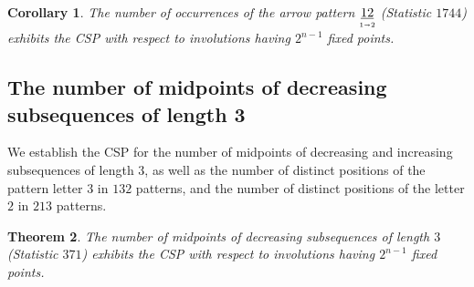 \documentclass{amsart}
\newtheorem{thm}{Theorem}[section]
\newtheorem{cor}[thm]{Corollary}
\theoremstyle{definition}
\newcommand{\arrowpattern}{\underset{\mathsmaller{1\shortrightarrow 2}}{\underline{12}}}
\newcommand{\cdes}{\textnormal{cdes}}
\begin{document}
\begin{cor}\label{cor:Corteel_arrow_CSP}
The number of occurrences of the arrow pattern $\arrowpattern$ (Statistic $1744$) exhibits the CSP with respect to involutions having $2^{n-1}$ fixed points.
\end{cor}


\subsection{The  number of midpoints of decreasing subsequences of length 3 }\label{subsec:Corteel midpoints}


We establish the CSP for the number of midpoints of decreasing and increasing subsequences of length $3$, as well as the number of distinct positions of the pattern letter $3$ in $132$ patterns, and the number of distinct positions of the letter $2$ in $213$ patterns.   

\begin{thm}
  \label{conj:371}
  The number of midpoints of decreasing subsequences of length $3$ (Statistic $371$) exhibits the CSP with respect to involutions having $2^{n-1}$ fixed points.  
\end{thm}
\end{document}
